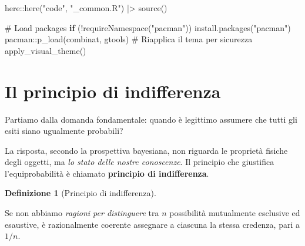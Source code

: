 \documentclass[
  italian,
  letterpaper,
  a4paper,
  11pt,
  open=any]{scrbook}
\newenvironment{Shaded}{\begin{snugshade}}{\end{snugshade}}
\newcommand{\CommentTok}[1]{\textcolor[rgb]{0.37,0.37,0.37}{#1}}
\newcommand{\ControlFlowTok}[1]{\textcolor[rgb]{0.00,0.23,0.31}{\textbf{#1}}}
\newcommand{\FunctionTok}[1]{\textcolor[rgb]{0.28,0.35,0.67}{#1}}
\newcommand{\NormalTok}[1]{\textcolor[rgb]{0.00,0.23,0.31}{#1}}
\newcommand{\SpecialCharTok}[1]{\textcolor[rgb]{0.37,0.37,0.37}{#1}}
\newcommand{\StringTok}[1]{\textcolor[rgb]{0.13,0.47,0.30}{#1}}
\theoremstyle{plain}
\theoremstyle{definition}
\theoremstyle{definition}
\newtheorem{definition}{Definizione}[chapter]
\theoremstyle{remark}
\begin{document}
\begin{tcolorbox}[enhanced jigsaw, arc=.35mm, bottomrule=.15mm, bottomtitle=1mm, breakable, colback=white, colbacktitle=quarto-callout-caution-color!10!white, colframe=quarto-callout-caution-color-frame, coltitle=black, left=2mm, leftrule=.75mm, opacityback=0, opacitybacktitle=0.6, rightrule=.15mm, title=\textcolor{quarto-callout-caution-color}{\faFire}\hspace{0.5em}{Preparazione del Notebook}, titlerule=0mm, toprule=.15mm, toptitle=1mm]

\begin{Shaded}
\begin{Highlighting}[]
\NormalTok{here}\SpecialCharTok{::}\FunctionTok{here}\NormalTok{(}\StringTok{"code"}\NormalTok{, }\StringTok{"\_common.R"}\NormalTok{) }\SpecialCharTok{|\textgreater{}} 
  \FunctionTok{source}\NormalTok{()}

\CommentTok{\# Load packages}
\ControlFlowTok{if}\NormalTok{ (}\SpecialCharTok{!}\FunctionTok{requireNamespace}\NormalTok{(}\StringTok{"pacman"}\NormalTok{)) }\FunctionTok{install.packages}\NormalTok{(}\StringTok{"pacman"}\NormalTok{)}
\NormalTok{pacman}\SpecialCharTok{::}\FunctionTok{p\_load}\NormalTok{(combinat, gtools)}
\CommentTok{\# Riapplica il tema per sicurezza}
\FunctionTok{apply\_visual\_theme}\NormalTok{()}
\end{Highlighting}
\end{Shaded}

\end{tcolorbox}

\section{Il principio di indifferenza}\label{sec-indifferenza}

Partiamo dalla domanda fondamentale: quando è legittimo assumere che
tutti gli esiti siano ugualmente probabili?

La risposta, secondo la prospettiva bayesiana, non riguarda le proprietà
fisiche degli oggetti, ma \emph{lo stato delle nostre conoscenze}. Il
principio che giustifica l'equiprobabilità è chiamato \textbf{principio
di indifferenza}.

\begin{definition}[Principio di
indifferenza]\protect\hypertarget{def-principle-indifference}{}\label{def-principle-indifference}

Se non abbiamo \emph{ragioni per distinguere} tra \(n\) possibilità
mutualmente esclusive ed esaustive, è razionalmente coerente assegnare a
ciascuna la stessa credenza, pari a \(1/n\).

\end{definition}
\end{document}
